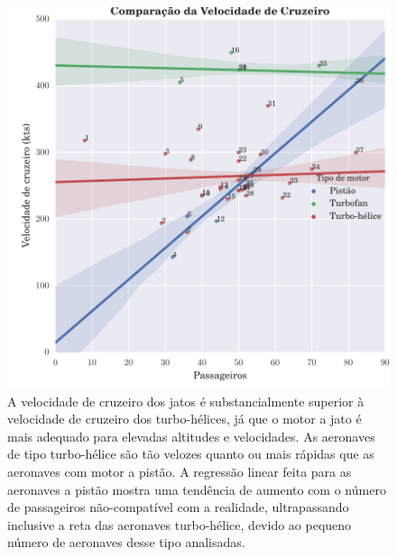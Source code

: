 \begin{figure}
\centering
\includegraphics{../autogenerated/graficos_comparativos/vcruzeiro.pdf}
\caption[Comparação da velocidade de cruzeiro]{
A velocidade de cruzeiro dos jatos é substancialmente superior à velocidade de cruzeiro dos turbo-hélices, já que o motor a jato é mais adequado para elevadas altitudes e velocidades.
As aeronaves de tipo turbo-hélice são tão velozes quanto ou mais rápidas que as aeronaves com motor a pistão.
A regressão linear feita para as aeronaves a pistão mostra uma tendência de aumento com o número de passageiros não-compatível com a realidade, ultrapassando inclusive a reta das aeronaves turbo-hélice, devido ao pequeno número de aeronaves desse tipo analisadas.
}
\label{fig:vcruzeiro}
\end{figure}

